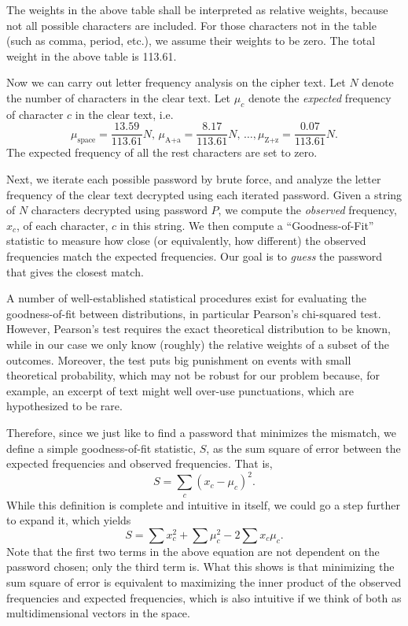 The weights in the above table shall be interpreted as relative weights, because not all possible characters are included. For those characters not in the table (such as comma, period, etc.), we assume their weights to be zero. The total weight in the above table is 113.61.

Now we can carry out letter frequency analysis on the cipher text. Let $N$ denote the number of characters in the clear text. Let $\mu_c$ denote the \emph{expected} frequency of character $c$ in the clear text, i.e. 
\[
\mu_{\text{space}} = \frac{13.59}{113.61} N, \,
\mu_{\text{A+a}} = \frac{8.17}{113.61} N, \,
\ldots, \mu_{\text{Z+z}} = \frac{0.07}{113.61} N .
\]
The expected frequency of all the rest characters are set to zero. %

Next, we iterate each possible password by brute force, and analyze the letter frequency of the clear text decrypted using each iterated password. Given a string of $N$ characters decrypted using password $P$, we compute the \emph{observed} frequency, $x_c$, of each character, $c$ in this string.
We then compute a ``Goodness-of-Fit'' statistic to measure how close (or equivalently, how different) the observed frequencies match the expected frequencies. Our goal is to \emph{guess} the password that gives the closest match.

A number of well-established statistical procedures exist for evaluating the goodness-of-fit between distributions, in particular Pearson's chi-squared test. However, Pearson's test requires the exact theoretical distribution to be known, while in our case we only know (roughly) the relative weights of a subset of the outcomes. Moreover, the test puts big punishment on events with small theoretical probability, which may not be robust for our problem because, for example, an excerpt of text might well over-use punctuations, which are hypothesized to be rare.

Therefore, since we just like to find a password that minimizes the mismatch, we define a simple goodness-of-fit statistic, $S$, as the sum square of error between the expected frequencies and observed frequencies. That is,
\[
S = \sum_{c} (x_c - \mu_c) ^2 .
\]
While this definition is complete and intuitive in itself, we could go a step further to expand it, which yields
\[
S = \sum x_c^2 + \sum \mu_c^2 - 2 \sum x_c \mu_c .
\]
Note that the first two terms in the above equation are not dependent on the password chosen; only the third term is. What this shows is that minimizing the sum square of error is equivalent to maximizing the inner product of the observed frequencies and expected frequencies, which is also intuitive if we think of both as multidimensional vectors in the space.

